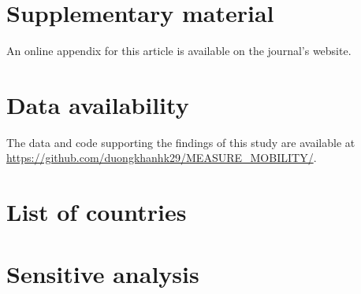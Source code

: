 \section*{Supplementary material}
An online appendix for this article is available on the journal's website.

\section*{Data availability}
The data and code supporting the findings of this study are available at \url{https://github.com/duongkhanhk29/MEASURE_MOBILITY/}.





\appendix

\newpage
\section{List of countries} \label{app:list}


\newpage
\section{Sensitive analysis} \label{app:sensitive}



